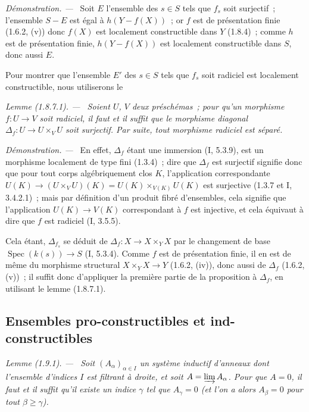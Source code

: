 \documentclass[10pt,oneside]{book}
\makeatletter
\newcommand{\setmanualcurrentlabel}[1]{\def\@currentlabel{#1}}
\newenvironment{lemma}[1][]{%
  \setmanualcurrentlabel{#1}\par\medskip\noindent\itshape Lemme (#1). ---\ }{\par}
\newenvironment{proof}{%
  \par\medskip\noindent\textit{Démonstration. ---\ }}{\par}
\newcommand{\EGAReaderTarget}[2]{\hypertarget{#1}{}\@bsphack\begingroup\def\@currentHref{#1}\label{#2}\endgroup\@esphack}
\makeatother
\begin{document}
\begin{proof}
Soit $E$ l'ensemble des $s\in S$ tels que $f_s$ soit surjectif~; l'ensemble
$S-E$ est égal à $h(Y-f(X))$~; or $f$ est de présentation finie (1.6.2, (v))
donc $f(X)$ est localement constructible dans $Y$ (1.8.4)~; comme $h$ est de
présentation finie, $h(Y-f(X))$ est localement constructible dans $S$, donc
aussi $E$.

Pour montrer que l'ensemble $E'$ des $s\in S$ tels que $f_s$ soit radiciel
est localement constructible, nous utiliserons le
\end{proof}

\begin{lemma}[1.8.7.1]
\EGAReaderTarget{ega4.c04.lem.1-8-7-1}{IV.1.8.7.1-fr}
Soient $U$, $V$ deux préschémas~; pour qu'un morphisme $f:U\to V$ soit
radiciel, il faut et il suffit que le morphisme diagonal
$\Delta_f:U\to U\times_VU$ soit surjectif. Par suite, tout morphisme radiciel
est séparé.
\end{lemma}

\begin{proof}
En effet, $\Delta_f$ étant une immersion (I, 5.3.9), est un morphisme
localement de type fini (1.3.4)~; dire que $\Delta_f$ est surjectif signifie
donc que pour tout corps algébriquement clos $K$, l'application
correspondante $U(K)\to(U\times_VU)(K)=U(K)\times_{V(K)}U(K)$ est surjective
(1.3.7 et I, 3.4.2.1)~; mais par définition d'un produit fibré d'ensembles,
cela signifie que l'application $U(K)\to V(K)$ correspondant à $f$ est
injective, et cela équivaut à dire que $f$ est radiciel (I, 3.5.5).

Cela étant, $\Delta_{f_s}$ se déduit de $\Delta_f:X\to X\times_YX$ par le
changement de base $\operatorname{Spec}(k(s))\to S$ (I, 5.3.4). Comme $f$
est de présentation finie, il en est de même du morphisme structural
$X\times_YX\to Y$ (1.6.2, (iv)), donc aussi de $\Delta_f$ (1.6.2, (v))~; il
suffit donc d'appliquer la première partie de la proposition à $\Delta_f$,
en utilisant le lemme (1.8.7.1).
\end{proof}

\subsection{Ensembles pro-constructibles et ind-constructibles}
\label{subsection:IV.1.9-fr}

\begin{lemma}[1.9.1]
\label{IV.1.9.1-fr}
Soit $(A_\alpha)_{\alpha\in I}$ un système inductif d'anneaux dont l'ensemble
d'indices $I$ est filtrant à droite, et soit $A=\varinjlim A_\alpha$. Pour que
$A=0$, il faut et il suffit qu'il existe un indice $\gamma$ tel que
$A_\gamma=0$ (et l'on a alors $A_\beta=0$ pour tout $\beta\geq\gamma$).
\end{lemma}
\end{document}
